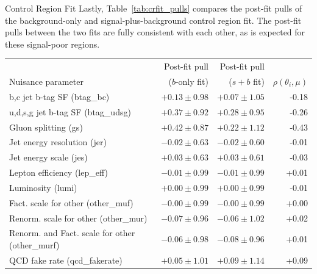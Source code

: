 \begin{section}{Control Region Fit}
Lastly, Table~\ref{tab:crfit_pulls} compares the post-fit pulls of the background-only and signal-plus-background control region fit.
The post-fit pulls between the two fits are fully consistent with each other, as is expected for these signal-poor regions.

\begin{table}[tbp!]
\begin{center}
\begin{tabular}{|l|r|r|r|} \hline
                                                  &  Post-fit pull     &  Post-fit pull     &                           \\
Nuisance parameter                                &  ($b$-only fit)    &  ($s+b$ fit)       &  $\rho(\theta_{i}, \mu)$  \\  \hline
b,c jet b-tag SF (btag\_bc)                       &  $+0.13 \pm 0.98$  &  $+0.07 \pm 1.05$  &  -0.18                    \\
u,d,s,g jet b-tag SF (btag\_udsg)                 &  $+0.37 \pm 0.92$  &  $+0.28 \pm 0.95$  &  -0.26                    \\
Gluon splitting (gs)                              &  $+0.42 \pm 0.87$  &  $+0.22 \pm 1.12$  &  -0.43                    \\
Jet energy resolution (jer)                       &  $-0.02 \pm 0.63$  &  $-0.02 \pm 0.60$  &  -0.01                    \\
Jet energy scale (jes)                            &  $+0.03 \pm 0.63$  &  $+0.03 \pm 0.61$  &  -0.03                    \\
Lepton efficiency (lep\_eff)                      &  $-0.01 \pm 0.99$  &  $-0.01 \pm 0.99$  &  +0.01                    \\   
Luminosity (lumi)                                 &  $+0.00 \pm 0.99$  &  $+0.00 \pm 0.99$  &  -0.01                    \\   
Fact. scale for other (other\_muf)                &  $-0.00 \pm 0.99$  &  $-0.00 \pm 0.99$  &  +0.00                    \\   
Renorm. scale for other (other\_mur)              &  $-0.07 \pm 0.96$  &  $-0.06 \pm 1.02$  &  +0.02                    \\   
Renorm. and Fact. scale for other (other\_murf)   &  $-0.06 \pm 0.98$  &  $-0.08 \pm 0.96$  &  +0.01                    \\   
QCD fake rate (qcd\_fakerate)                     &  $+0.05 \pm 1.01$  &  $+0.09 \pm 1.14$  &  +0.09                    \\   

\end{tabular}
\end{center}
\end{table}
\end{section}
